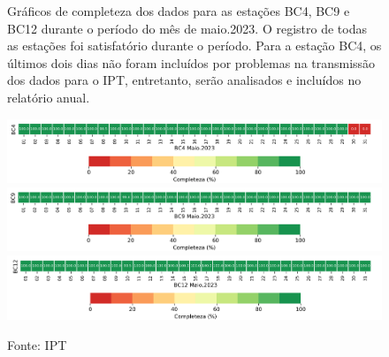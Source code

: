 
\begin{figure}[ht!]
    \centering
	\captionsetup{justification=justified, singlelinecheck=false, width=1\textwidth}
    \caption{Gráficos de completeza dos dados para as estações BC4, BC9 e BC12 durante o período do mês de maio.2023. O registro de todas as estações foi satisfatório durante o período. Para a estação BC4, os últimos dois dias não foram incluídos por problemas na transmissão dos dados para o IPT, entretanto, serão analisados e incluídos no relatório anual. }
    \includegraphics[width=1.0\textwidth]{./boletim/baesa/figuras/bc4_completude.png}
    \includegraphics[width=1.0\textwidth]{./boletim/baesa/figuras/bc9_completude.png}
    \includegraphics[width=1.0\textwidth]{./boletim/baesa/figuras/bc12_completude.png}
    \caption*{Fonte: IPT}
\end{figure}

